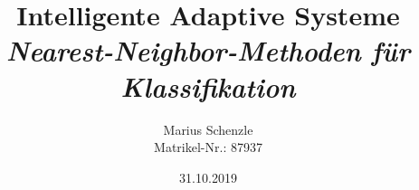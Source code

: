 

\title{\textbf{Intelligente Adaptive Systeme}\\\textit{Nearest-Neighbor-Methoden für Klassifikation}}
\author{Marius Schenzle\\Matrikel-Nr.: 87937}
\date{31.10.2019}


\doublespacing
{}
\maketitle
\newpage
\tableofcontents
\newpage
\singlespacing
{}

% 



